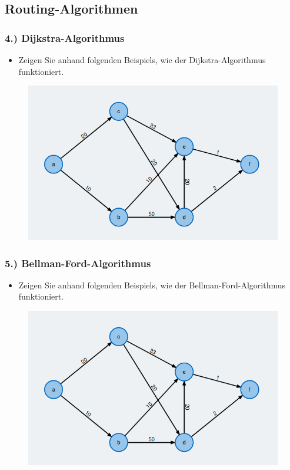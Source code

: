 \documentclass[xcolor=dvipsnames, aspectratio=169]{beamer}
\begin{document}
\subsection{Routing-Algorithmen}
\begin{frame}
\frametitle{4.) Dijkstra-Algorithmus}
	\begin{itemize}
		\item Zeigen Sie anhand folgenden Beispiels, wie der Dijkstra-Algorithmus funktioniert.
	\end{itemize}
	\begin{figure}[H]
	\centering
	\includegraphics[scale=0.35]{dijkstra_example}
	\end{figure}
\end{frame}

\begin{frame}
\frametitle{5.) Bellman-Ford-Algorithmus}
	\begin{itemize}
		\item Zeigen Sie anhand folgenden Beispiels, wie der Bellman-Ford-Algorithmus funktioniert.
	\end{itemize}
	\begin{figure}[H]
	\centering
	\includegraphics[scale=0.35]{dijkstra_example}
	\end{figure}
\end{frame}
\end{document}
